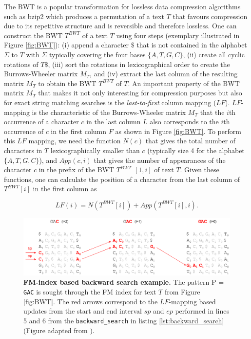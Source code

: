 The BWT is a popular transformation for lossless data compression algorithms such as bzip2 which produces a permutation of a text $T$ that favours compression due to its repetitive structure and is reversible and therefore lossless. One can construct the BWT $T^{BWT}$ of a text $T$ using four steps (exemplary illustrated in Figure \ref{fig:BWT}): (i) append a character $\$$ that is not contained in the alphabet $\Sigma$ to $T$ with $\Sigma$ typically covering the four bases $\{A, T, G, C\}$, (ii) create all cyclic rotations of $T\$$, (iii) sort the rotations in lexicographical order to create the Burrows-Wheeler matrix $M_T$, and (iv) extract the last column of the resulting matrix $M_T$ to obtain the BWT $T^{BWT}$ of $T$. An important property of the BWT matrix $M_T$ that makes it not only interesting for compression purposes but also for exact string matching searches is the \textit{last-to-first} column mapping ($LF$). $LF$-mapping is the characteristic of the Burrows-Wheeler matrix $M_T$ that the $i$th occurrence of a character $c$ in the last column $L$ also corresponds to the $i$th occurrence of $c$ in the first column $F$ as shown in Figure \ref{fig:BWT}. To perform this $LF$ mapping, we need the function $N(c)$ that gives the total number of characters in $T$ lexicographically smaller than $c$ (typically size 4 for the alphabet $\{A, T, G, C\}$), and $App(c,i)$ that gives the number of appearances of the character $c$ in the prefix of the BWT $T^{BWT}$ $[1,i]$ of text $T$. Given these functions, one can calculate the position of a character from the last column of $T^{BWT}[i]$ in the first column as

$$LF(i) = N(T^{BWT}[i]) + App(T^{BWT}[i], i).$$

\begin{figure}[h]
	 \centering
	 \includegraphics[width=1\linewidth]{img/chapter1/FM}
	  \caption[FM-index based backward search example]{\textbf{FM-index based backward search example.} The pattern P = \texttt{GAC} is sought through the FM index for text $T$ from Figure \ref{fig:BWT}. The red arrows correspond to the $LF$-mapping based updates from the start and end interval $sp$ and $ep$ performed in lines 5 and 6 from the \texttt{backward\_search} in listing \ref{lst:backward_search} (Figure adapted from \citeauthor{Canzar2015} \citep{Canzar2015}).}
	 \label{fig:FM}
\end{figure}

